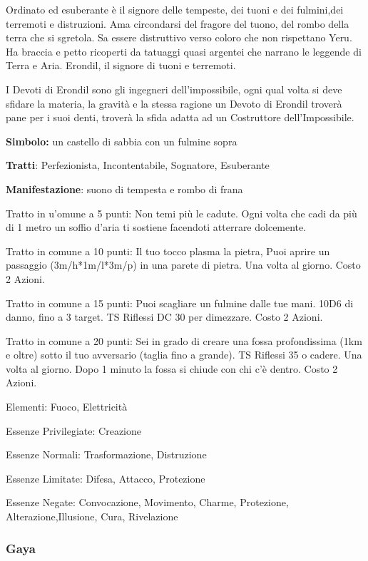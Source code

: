 \documentclass[a4paper,11pt,twoside,openany]{book}
\begin{document}
Ordinato ed esuberante è il signore delle tempeste, dei tuoni e dei fulmini,dei terremoti e distruzioni. Ama circondarsi del fragore del tuono, del rombo della terra che si sgretola. Sa essere distruttivo verso coloro che non rispettano Yeru.
Ha braccia e petto ricoperti da tatuaggi quasi argentei che narrano le leggende di Terra e Aria. Erondil, il signore di tuoni e terremoti.


I Devoti di Erondil sono gli ingegneri dell'impossibile, ogni qual volta si deve sfidare la materia, la gravità e la stessa ragione un Devoto di Erondil troverà pane per i suoi denti, troverà la sfida adatta ad un Costruttore dell'Impossibile.

\textbf{Simbolo:} un castello di sabbia con un fulmine sopra

\textbf{Tratti}: Perfezionista, Incontentabile, Sognatore, Esuberante

\textbf{Manifestazione}: suono di tempesta e rombo di frana

\bigskip

Tratto in u'omune a 5 punti: Non temi più le cadute. Ogni volta che cadi da più di 1 metro un soffio d'aria ti sostiene facendoti atterrare dolcemente.

Tratto in comune a 10 punti: Il tuo tocco plasma la pietra, Puoi aprire un passaggio (3m/h{*}1m/l{*}3m/p) in una parete di pietra. Una volta al giorno. Costo 2 Azioni.

Tratto in comune a 15 punti: Puoi scagliare un fulmine dalle tue mani. 10D6 di danno, fino a 3 target. TS Riflessi DC 30 per dimezzare. Costo 2 Azioni.

Tratto in comune a 20 punti: Sei in grado di creare una fossa profondissima (1km e oltre) sotto il tuo avversario (taglia fino a grande). TS Riflessi 35 o cadere. Una volta al giorno. Dopo 1 minuto la fossa si chiude con chi c'è dentro. Costo 2 Azioni.

\bigskip

Elementi: Fuoco, Elettricità

\bigskip

Essenze Privilegiate: Creazione

Essenze Normali: Trasformazione, Distruzione

Essenze Limitate: Difesa, Attacco, Protezione

Essenze Negate: Convocazione, Movimento, Charme, Protezione, Alterazione,Illusione, Cura, Rivelazione

\subsubsection{Gaya}
\end{document}
